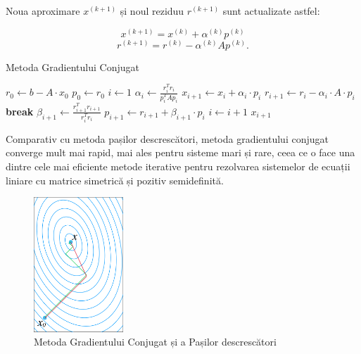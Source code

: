 \documentclass{exam}
\begin{document}
Noua aproximare $x^{(k+1)}$ și noul reziduu $r^{(k+1)}$ sunt actualizate astfel:

$$
x^{(k+1)} = x^{(k)} + \alpha^{(k)} p^{(k)}
$$
$$
r^{(k+1)} = r^{(k)} - \alpha^{(k)} A p^{(k)}.
$$

\begin{algorithm}[H]
    \caption{Metoda Gradientului Conjugat}
    \begin{algorithmic}[1]
        \State $r_0 \gets b - A \cdot x_0$ 
        \State $p_0 \gets r_0$ 
        \State $i \gets 1$
            \State $\alpha_i \gets \frac{r_i^T r_i}{p_i^T A p_i}$ 
            \State $x_{i+1} \gets x_i + \alpha_i \cdot p_i$ 
            \State $r_{i+1} \gets r_i - \alpha_i \cdot A \cdot p_i$ 
                \State \textbf{break}
            \EndIf
            \State $\beta_{i+1} \gets \frac{r_{i+1}^T r_{i+1}}{r_i^T r_i}$ 
            \State $p_{i+1} \gets r_{i+1} + \beta_{i + 1} \cdot p_i$ 
            \State $i \gets i + 1$
        \EndWhile
        \State \Return $x_{i+1}$
    \end{algorithmic}
\end{algorithm}

Comparativ cu metoda pașilor descrescători, metoda gradientului conjugat converge mult mai rapid, mai ales pentru sisteme mari și rare, ceea ce o face una dintre cele mai eficiente metode iterative pentru rezolvarea sistemelor de ecuații liniare cu matrice simetrică și pozitiv semidefinită.
\begin{figure}[H]
	\centering
	\includegraphics[width=0.3\textwidth]{lab6/img/conjugate_vs_steepest.png}
	\caption{Metoda Gradientului Conjugat și a Pașilor descrescători}
	\label{fig:1}
\end{figure}
\end{document}
